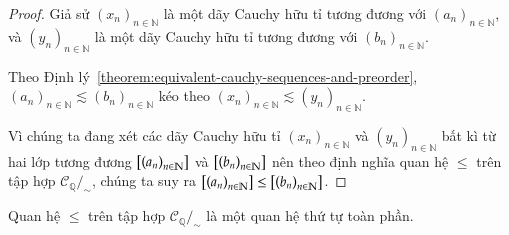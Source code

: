 \begin{proof}
    Giả sử ${(x_{n})}_{n\in\mathbb{N}}$ là một dãy Cauchy hữu tỉ tương đương với ${(a_{n})}_{n\in\mathbb{N}}$, và ${(y_{n})}_{n\in\mathbb{N}}$ là một dãy Cauchy hữu tỉ tương đương với ${(b_{n})}_{n\in\mathbb{N}}$.

    Theo Định lý~\ref{theorem:equivalent-cauchy-sequences-and-preorder}, ${(a_{n})}_{n\in\mathbb{N}}\lesssim {(b_{n})}_{n\in\mathbb{N}}$ kéo theo ${(x_{n})}_{n\in\mathbb{N}}\lesssim {(y_{n})}_{n\in\mathbb{N}}$.

    Vì chúng ta đang xét các dãy Cauchy hữu tỉ ${(x_{n})}_{n\in\mathbb{N}}$ và ${(y_{n})}_{n\in\mathbb{N}}$ bất kì từ hai lớp tương đương $\left[{\left({a_{n}}\right)}_{{n}\in\mathbb{N}}\right]$ và $\left[{\left({b_{n}}\right)}_{{n}\in\mathbb{N}}\right]$ nên theo định nghĩa quan hệ $\leq$ trên tập hợp $\mathscr{C}_{\mathbb{Q}}/_{\sim}$, chúng ta suy ra $\left[{\left({a_{n}}\right)}_{{n}\in\mathbb{N}}\right]\leq \left[{\left({b_{n}}\right)}_{{n}\in\mathbb{N}}\right]$.
\end{proof}

\begin{theorem}
    Quan hệ $\leq$ trên tập hợp $\mathscr{C}_{\mathbb{Q}}/_{\sim}$ là một quan hệ thứ tự toàn phần.
\end{theorem}


